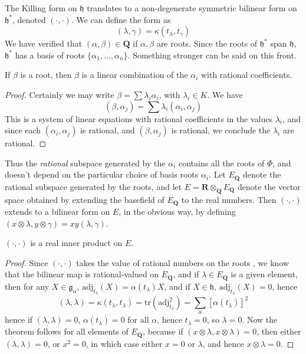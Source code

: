 The Killing form on $\mathfrak{h}$ translates to a non-degenerate symmetric bilinear form on $\mathfrak{h}^*$, denoted $(\cdot, \cdot)$. We can define the form as
%
\[ (\lambda,\gamma) = \kappa(t_\lambda, t_\gamma) \]
%
We have verified that $(\alpha, \beta) \in \mathbf{Q}$ if $\alpha, \beta$ are roots. Since the roots of $\mathfrak{h}^*$ span $\mathfrak{h}$, $\mathfrak{h}^*$ has a basis of roots $\{ \alpha_1, \dots, \alpha_n \}$. Something stronger can be said on this front.

\begin{lemma}
    If $\beta$ is a root, then $\beta$ is a linear combination of the $\alpha_i$ with rational coefficients.
\end{lemma}
\begin{proof}
    Certainly we may write $\beta = \sum \lambda_i \alpha_i$, with $\lambda_i \in K$. We have
    \[ (\beta, \alpha_j) = \sum \lambda_i (\alpha_i, \alpha_j) \]
    This is a system of linear equations with rational coefficients in the values $\lambda_i$, and since each $(\alpha_i, \alpha_j)$ is rational, and $(\beta, \alpha_j)$ is rational, we conclude the $\lambda_i$ are rational.
\end{proof}

Thus the {\it rational} subspace generated by the $\alpha_i$ contains all the roots of $\Phi$, and doesn't depend on the particular choice of basis roots $\alpha_i$. Let $E_{\mathbf{Q}}$ denote the rational subspace generated by the roots, and let $E = \mathbf{R} \otimes_{\mathbf{Q}} E_{\mathbf{Q}}$ denote the vector space obtained by extending the basefield of $E_{\mathbf{Q}}$ to the real numbers. Then $(\cdot, \cdot)$ extends to a bilinear form on $E$, in the obvious way, by defining $(x \otimes \lambda, y \otimes \gamma) = xy (\lambda, \gamma)$.

\begin{theorem}
    $(\cdot, \cdot)$ is a real inner product on $E$.
\end{theorem}
\begin{proof}
    Since $(\cdot, \cdot)$ takes the value of rational numbers on the roots , we know that the bilinear map is rational-valued on $E_{\mathbf{Q}}$, and if $\lambda \in E_{\mathbf{Q}}$ is a given element, then for any $X \in \mathfrak{g}_\alpha$, $\text{adj}_{t_\lambda}(X) = \alpha(t_\lambda) X$, and if $X \in \mathfrak{h}$, $\text{adj}_{t_\lambda}(X) = 0$, hence
    \[ (\lambda, \lambda) = \kappa(t_\lambda, t_\lambda) = \text{tr}(\text{adj}_{t_\lambda}^2) = \sum_\alpha \left[\alpha(t_\lambda)\right]^2 \]
    hence if $(\lambda, \lambda) = 0$, $\alpha(t_\lambda) = 0$ for all $\alpha$, hence $t_\lambda = 0$, so $\lambda = 0$. Now the theorem follows for all elements of $E_{\mathbf{Q}}$, because if $(x \otimes \lambda, x \otimes \lambda) = 0$, then either $(\lambda, \lambda) = 0$, or $x^2 = 0$, in which case either $x = 0$ or $\lambda$, and hence $x \otimes \lambda = 0$.
\end{proof}






